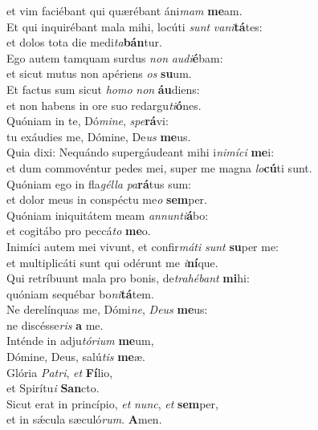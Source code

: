 \evenverse et vim faciébant qui quærébant áni\textit{mam} \textbf{me}am.\\
\oddverse Et qui inquirébant mala mihi, locúti \textit{sunt} \textit{va}\textit{ni}\textbf{tá}tes:~\*\\
\oddverse et dolos tota die medi\textit{ta}\textbf{bán}tur.\\
\evenverse Ego autem tamquam surdus \textit{non} \textit{au}\textit{di}\textbf{é}bam:~\*\\
\evenverse et sicut mutus non apériens \textit{os} \textbf{su}um.\\
\oddverse Et factus sum sicut \textit{ho}\textit{mo} \textit{non} \textbf{áu}diens:~\*\\
\oddverse et non habens in ore suo redargu\textit{ti}\textbf{ó}nes.\\
\evenverse Quóniam in te, Dó\textit{mi}\textit{ne}, \textit{spe}\textbf{rá}vi:~\*\\
\evenverse tu exáudies me, Dómine, De\textit{us} \textbf{me}us.\\
\oddverse Quia dixi: Nequándo supergáudeant mihi i\textit{ni}\textit{mí}\textit{ci} \textbf{me}i:~\*\\
\oddverse et dum commovéntur pedes mei, super me magna \textit{lo}\textbf{cú}ti sunt.\\
\evenverse Quóniam ego in fla\textit{gél}\textit{la} \textit{pa}\textbf{rá}tus sum:~\*\\
\evenverse et dolor meus in conspéctu me\textit{o} \textbf{sem}per.\\
\oddverse Quóniam iniquitátem meam \textit{an}\textit{nun}\textit{ti}\textbf{á}bo:~\*\\
\oddverse et cogitábo pro peccá\textit{to} \textbf{me}o.\\
\evenverse Inimíci autem mei vivunt, et confir\textit{má}\textit{ti} \textit{sunt} \textbf{su}per me:~\*\\
\evenverse et multiplicáti sunt qui odérunt me \textit{i}\textbf{ní}que.\\
\oddverse Qui retríbuunt mala pro bonis, de\textit{tra}\textit{hé}\textit{bant} \textbf{mi}hi:~\*\\
\oddverse quóniam sequébar bo\textit{ni}\textbf{tá}tem.\\
\evenverse Ne derelínquas me, Dómi\textit{ne}, \textit{De}\textit{us} \textbf{me}us:~\*\\
\evenverse ne discésse\textit{ris} \textbf{a} me.\\
\oddverse Inténde in adju\textit{tó}\textit{ri}\textit{um} \textbf{me}um,~\*\\
\oddverse Dómine, Deus, salú\textit{tis} \textbf{me}æ.\\
\evenverse Glória \textit{Pa}\textit{tri}, \textit{et} \textbf{Fí}lio,~\*\\
\evenverse et Spirítu\textit{i} \textbf{San}cto.\\
\oddverse Sicut erat in princípio, \textit{et} \textit{nunc}, \textit{et} \textbf{sem}per,~\*\\
\oddverse et in sǽcula sæculó\textit{rum}. \textbf{A}men.\\
